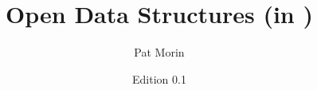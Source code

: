 \documentclass[11pt]{book}
\title{Open Data Structures (in \lang)}
\author{Pat Morin}
\date{Edition 0.1\cpponly{$\beta$}}
\begin{document}
\begin{titlepage}
  \maketitle
\end{titlepage}

\ \thispagestyle{empty}\newpage

\setcounter{page}{1}

\ \thispagestyle{empty}\newpage
\cpponly{
\ \thispagestyle{empty}\newpage
}


\tableofcontents


















\end{document}
